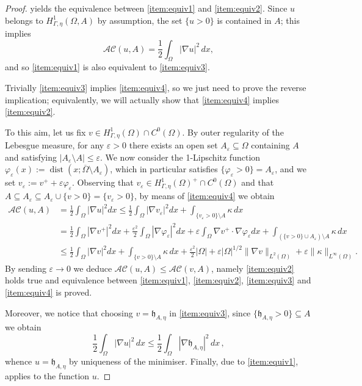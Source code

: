 \documentclass[a4paper,11pt,reqno]{amsart}
\numberwithin{equation}{section}
\theoremstyle{definition}
\theoremstyle{remark}
\begin{document}
\begin{proof} 
     yields the equivalence between \eqref{item:equiv1} and \eqref{item:equiv2}. Since $u$ belongs to $H^1_{\Gamma,\eta}(\Omega,A)$ by assumption, the set $\{u>0\}$ is contained in $A$; this implies
    \begin{equation}
       \mathcal{AC}(u,A)=\frac 12 \int_\Omega |\nabla u|^2 \, dx, 
    \end{equation}
    and so \eqref{item:equiv1} is also equivalent to \eqref{item:equiv3}.

    Trivially \eqref{item:equiv3} implies \eqref{item:equiv4}, so we just need to prove the reverse implication; equivalently, we will actually show that \eqref{item:equiv4} implies \eqref{item:equiv2}.

    To this aim, let us fix $v\in  H^1_{\Gamma,\eta}(\Omega)\cap C^0(\Omega)$. By outer regularity of the Lebesgue measure, for any $\varepsilon >0$ there exists an open set $A_\varepsilon\subseteq \Omega$ containing $A$ and satisfying $|A_\varepsilon\setminus A|\le \varepsilon$. We now consider the 1-Lipschitz function $\varphi_\varepsilon(x):=\operatorname{dist}(x;\overline{\Omega}\setminus A_\varepsilon)$, which in particular satisfies $\{\varphi_\varepsilon>0\}=A_\varepsilon$, and we set $v_\varepsilon:=v^++\varepsilon\varphi_\varepsilon $. Observing that $v_\varepsilon\in H^1_{\Gamma,\eta}(\Omega)^+\cap C^0(\Omega)$ and that $A\subseteq A_\varepsilon\subseteq A_\varepsilon\cup \{v>0\}=\{v_\varepsilon>0\}$, by means of \eqref{item:equiv4} we obtain
    \begin{align}
        \mathcal{AC}(u,A)&=\frac 12 \int_\Omega |\nabla u|^2 dx\le \frac 12 \int_\Omega |\nabla v_\varepsilon|^2 dx+\int_{\{v_\varepsilon>0\}\setminus A}\kappa\, dx\\
        &=\frac 12 \int_\Omega |\nabla v^+|^2 dx+\frac{\varepsilon^2}{2}\int_\Omega |\nabla \varphi_\varepsilon|^2 dx+ \varepsilon\int_\Omega \nabla v^+\cdot\nabla \varphi_\varepsilon dx+ \int_{(\{v>0\}\cup A_\varepsilon)\setminus A}\kappa\, dx\\
        &\le \frac 12 \int_\Omega |\nabla v|^2 dx +\int_{\{v>0\}\setminus A}\kappa\, dx+\frac{\varepsilon^2}{2}|\Omega|+\varepsilon|\Omega|^{1/2}\|\nabla v\|_{L^2(\Omega)}+\varepsilon\|\kappa\|_{L^\infty(\Omega)}.
    \end{align}
    By sending $\varepsilon\to 0$ we deduce $\mathcal{AC}(u,A)\le \mathcal{AC}(v,A)$, namely \eqref{item:equiv2} holds true and equivalence between \eqref{item:equiv1}, \eqref{item:equiv2}, \eqref{item:equiv3} and \eqref{item:equiv4} is proved.

    Moreover, we notice that choosing $v=\mathfrak{h}_{A,\eta}$ in \eqref{item:equiv3}, since $\{\mathfrak{h}_{A,\eta}>0\}\subseteq A$ we obtain 
    \begin{equation}
        \frac 12\int_\Omega |\nabla u|^2 \, dx   \leq \frac 12 \int_\Omega |\nabla \mathfrak{h}_{A,\eta}|^2 \, dx \,,
    \end{equation}
    whence $u=\mathfrak{h}_{A,\eta}$  by uniqueness of the minimiser.
    Finally, due to \eqref{item:equiv1},  applies to the function $u$.
\end{proof}
\end{document}
